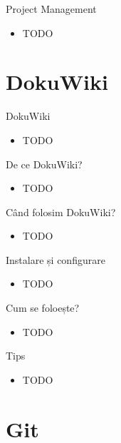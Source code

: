 \documentclass{beamer}
\begin{document}
\begin{frame}{Project Management}
  \begin{itemize}
    \item TODO
  \end{itemize}
\end{frame}

\section{DokuWiki}

\begin{frame}{DokuWiki}
  \begin{itemize}
    \item TODO
  \end{itemize}
\end{frame}

\begin{frame}{De ce DokuWiki?}
  \begin{itemize}
    \item TODO
  \end{itemize}
\end{frame}

\begin{frame}{Când folosim DokuWiki?}
  \begin{itemize}
    \item TODO
  \end{itemize}
\end{frame}

\begin{frame}{Instalare și configurare}
  \begin{itemize}
    \item TODO
  \end{itemize}
\end{frame}

\begin{frame}{Cum se foloește?}
  \begin{itemize}
    \item TODO
  \end{itemize}
\end{frame}

\begin{frame}{Tips}
  \begin{itemize}
    \item TODO
  \end{itemize}
\end{frame}

\section{Git}
\end{document}
